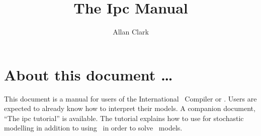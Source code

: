\documentclass[10pt,a4paper]{article}
\title{The Ipc Manual}
\author{
Allan Clark
}
\begin{document}
\maketitle


\section*{About this document \ldots}

This document is a manual for users of the International \pepa\ Compiler
or \ipc. Users are expected to already know how to interpret their
models. A companion document, ``The ipc tutorial'' is available.
The tutorial explains how to use \pepa\cite{pepa} for stochastic modelling
in addition to using \ipc\ in order to solve \pepa\ models.





\end{document}
